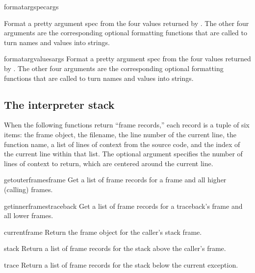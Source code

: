 \begin{funcdesc}{formatargspec}{args}
  
  Format a pretty argument spec from the four values returned by
  .  The other four arguments are the
  corresponding optional formatting functions that are called to turn
  names and values into strings.
\end{funcdesc}

\begin{funcdesc}{formatargvalues}{args}
  Format a pretty argument spec from the four values returned by
  .  The other four arguments are the
  corresponding optional formatting functions that are called to turn
  names and values into strings.
\end{funcdesc}

\subsection{The interpreter stack
            \label{inspect-stack}}

When the following functions return ``frame records,'' each record
is a tuple of six items: the frame object, the filename,
the line number of the current line, the function name, a list of
lines of context from the source code, and the index of the current
line within that list.
The optional  argument specifies the number of lines of
context to return, which are centered around the current line.

\begin{funcdesc}{getouterframes}{frame}
  Get a list of frame records for a frame and all higher (calling)
  frames.
\end{funcdesc}

\begin{funcdesc}{getinnerframes}{traceback}
  Get a list of frame records for a traceback's frame and all lower
  frames.
\end{funcdesc}

\begin{funcdesc}{currentframe}{}
  Return the frame object for the caller's stack frame.
\end{funcdesc}

\begin{funcdesc}{stack}{}
  Return a list of frame records for the stack above the caller's
  frame.
\end{funcdesc}

\begin{funcdesc}{trace}{}
  Return a list of frame records for the stack below the current
  exception.
\end{funcdesc}
